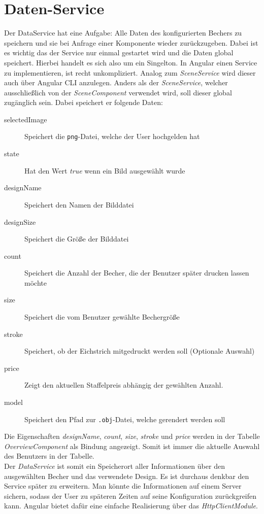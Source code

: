 \section{Daten-Service}
\label{sec:umsetzung}
%
Der DataService hat eine Aufgabe: Alle Daten des konfigurierten Bechers zu speichern und sie bei Anfrage einer Komponente wieder zurückzugeben. Dabei ist es wichtig das der Service nur einmal gestartet wird und die Daten global speichert. Hierbei handelt es sich also um ein Singelton. In Angular einen Service zu implementieren, ist recht unkompliziert. Analog zum \textit{SceneService} wird dieser auch über Angular CLI anzulegen. Anders als der \textit{SceneService}, welcher ausschließlich von der \textit{SceneComponent} verwendet wird, soll dieser global zugänglich sein. Dabei speichert er folgende Daten:
\begin{description}
	\item[selectedImage] Speichert die \texttt{png}-Datei, welche der User hochgelden hat
	\item[state] Hat den Wert \textit{true} wenn ein Bild ausgewählt wurde
	\item[designName] Speichert den Namen der Bilddatei
	\item[designSize] Speichert die Größe der Bilddatei
	\item[count] Speichert die Anzahl der Becher, die der Benutzer später drucken lassen möchte 
	\item[size] Speichert die vom Benutzer gewählte Bechergröße
	\item[stroke] Speichert, ob der Eichstrich mitgedruckt werden soll (Optionale Auswahl)
	\item[price] Zeigt den aktuellen Staffelpreis abhängig der gewählten Anzahl.
	\item[model] Speichert den Pfad zur \texttt{.obj}-Datei, welche gerendert werden soll
\end{description}
%
Die Eigenschaften \textit{designName}, \textit{count}, \textit{size}, \textit{stroke} und \textit{price} werden in der Tabelle \textit{OverviewComponent} als Bindung angezeigt. Somit ist immer die aktuelle Auswahl des Benutzers in der Tabelle. \\
Der \textit{DataService} ist somit ein Speicherort aller Informationen über den ausgewählten Becher und das verwendete Design. Es ist durchaus denkbar den Service später zu erweitern. Man könnte die Informationen auf einem Server sichern, sodass der User zu späteren Zeiten auf seine Konfiguration zurückgreifen kann. Angular bietet dafür eine einfache Realisierung über das \textit{HttpClientModule}.

